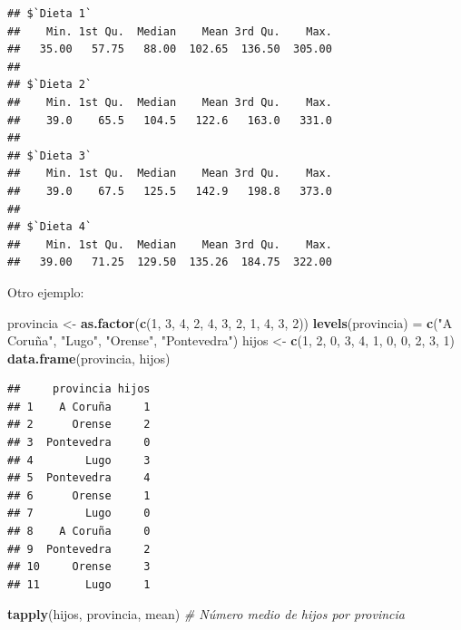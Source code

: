 \documentclass[]{book}
\newenvironment{Shaded}{\begin{snugshade}}{\end{snugshade}}
\newcommand{\KeywordTok}[1]{\textcolor[rgb]{0.13,0.29,0.53}{\textbf{#1}}}
\newcommand{\DecValTok}[1]{\textcolor[rgb]{0.00,0.00,0.81}{#1}}
\newcommand{\StringTok}[1]{\textcolor[rgb]{0.31,0.60,0.02}{#1}}
\newcommand{\CommentTok}[1]{\textcolor[rgb]{0.56,0.35,0.01}{\textit{#1}}}
\newcommand{\NormalTok}[1]{#1}
\begin{document}
\begin{verbatim}
## $`Dieta 1`
##    Min. 1st Qu.  Median    Mean 3rd Qu.    Max. 
##   35.00   57.75   88.00  102.65  136.50  305.00 
## 
## $`Dieta 2`
##    Min. 1st Qu.  Median    Mean 3rd Qu.    Max. 
##    39.0    65.5   104.5   122.6   163.0   331.0 
## 
## $`Dieta 3`
##    Min. 1st Qu.  Median    Mean 3rd Qu.    Max. 
##    39.0    67.5   125.5   142.9   198.8   373.0 
## 
## $`Dieta 4`
##    Min. 1st Qu.  Median    Mean 3rd Qu.    Max. 
##   39.00   71.25  129.50  135.26  184.75  322.00
\end{verbatim}

Otro ejemplo:

\begin{Shaded}
\begin{Highlighting}[]
\NormalTok{provincia <-}\StringTok{ }\KeywordTok{as.factor}\NormalTok{(}\KeywordTok{c}\NormalTok{(}\DecValTok{1}\NormalTok{, }\DecValTok{3}\NormalTok{, }\DecValTok{4}\NormalTok{, }\DecValTok{2}\NormalTok{, }\DecValTok{4}\NormalTok{, }\DecValTok{3}\NormalTok{, }\DecValTok{2}\NormalTok{, }\DecValTok{1}\NormalTok{, }\DecValTok{4}\NormalTok{, }\DecValTok{3}\NormalTok{, }\DecValTok{2}\NormalTok{))}
\KeywordTok{levels}\NormalTok{(provincia) =}\StringTok{ }\KeywordTok{c}\NormalTok{(}\StringTok{"A Coruña"}\NormalTok{, }\StringTok{"Lugo"}\NormalTok{, }\StringTok{"Orense"}\NormalTok{, }\StringTok{"Pontevedra"}\NormalTok{)}
\NormalTok{hijos <-}\StringTok{ }\KeywordTok{c}\NormalTok{(}\DecValTok{1}\NormalTok{, }\DecValTok{2}\NormalTok{, }\DecValTok{0}\NormalTok{, }\DecValTok{3}\NormalTok{, }\DecValTok{4}\NormalTok{, }\DecValTok{1}\NormalTok{, }\DecValTok{0}\NormalTok{, }\DecValTok{0}\NormalTok{, }\DecValTok{2}\NormalTok{, }\DecValTok{3}\NormalTok{, }\DecValTok{1}\NormalTok{)}
\KeywordTok{data.frame}\NormalTok{(provincia, hijos)}
\end{Highlighting}
\end{Shaded}

\begin{verbatim}
##     provincia hijos
## 1    A Coruña     1
## 2      Orense     2
## 3  Pontevedra     0
## 4        Lugo     3
## 5  Pontevedra     4
## 6      Orense     1
## 7        Lugo     0
## 8    A Coruña     0
## 9  Pontevedra     2
## 10     Orense     3
## 11       Lugo     1
\end{verbatim}

\begin{Shaded}
\begin{Highlighting}[]
\KeywordTok{tapply}\NormalTok{(hijos, provincia, mean) }\CommentTok{# Número medio de hijos por provincia}
\end{Highlighting}
\end{Shaded}
\end{document}
